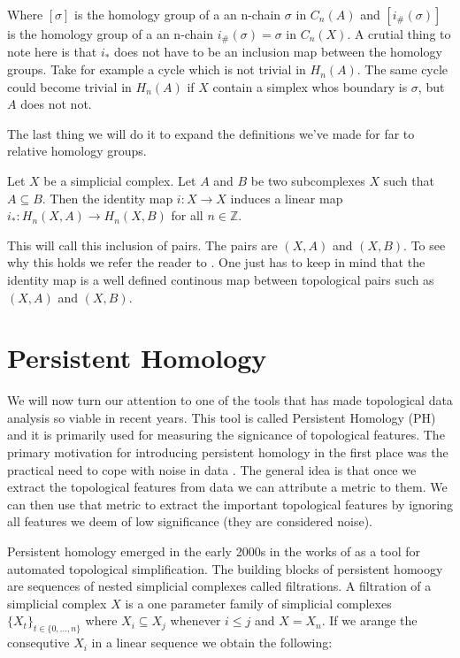 Where $[\sigma]$ is the homology group of a an n-chain $\sigma$ in $C_n(A)$ and $[i_\#(\sigma)]$ is the homology group of a an n-chain $i_\#(\sigma) = \sigma$ in $C_n(X)$. A crutial thing to note here is that $i_*$ does not have to be an inclusion map between the homology groups. Take for example a cycle which is not trivial in $H_n(A)$. The same cycle could become trivial in $H_n(A)$ if $X$ contain a simplex whos boundary is $\sigma$, but $A$ does not not.

The last thing we will do it to expand the definitions we've made for far to relative homology groups.

\begin{defn} Let $X$ be a simplicial complex. Let $A$ and $B$ be two subcomplexes $X$ such that $A \subseteq B$. Then the identity map $i: X \to X$ induces a linear map $i_*: H_n(X, A) \to H_n(X, B)$ for all $n \in \mathbb{Z}$.
\end{defn}

This will call this inclusion of pairs. The pairs are $(X, A)$ and $(X, B)$. To see why this holds we refer the reader to \cite{algebraic-topology}. One just has to keep in mind that the identity map is a well defined continous map between topological pairs such as $(X, A)$ and $(X, B)$.


\section{Persistent Homology}

We will now turn our attention to one of the tools that has made topological data analysis so viable in recent years. This tool is called Persistent Homology (PH) and it is primarily used for measuring the signicance of topological features. The primary motivation for introducing persistent homology in the first place was the practical need to cope with noise in data \cite{comp-topo}. The general idea is that once we extract the topological features from data we can attribute a metric to them. We can then use that metric to extract the important topological features by ignoring all features we deem of low significance (they are considered noise).



Persistent homology emerged in the early 2000s in the works of \cite{persistence-original} as a tool for automated topological simplification. The building blocks of persistent homoogy are sequences of nested simplicial complexes called filtrations. A filtration of a simplicial complex $X$ is a one parameter family of simplicial complexes $\{X_t\}_{t \in \{0, ..., n\}}$ where $X_i \subseteq X_j$ whenever $i \le j$ and $X = X_n$. If we arange the consequtive $X_i$ in a linear sequence we obtain the following:


